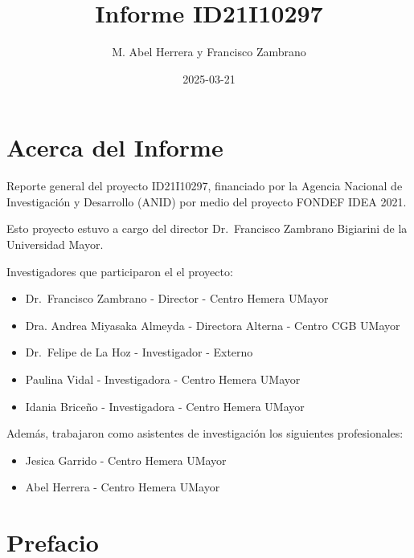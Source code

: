 \documentclass[
  letterpaper,
  DIV=11,
  numbers=noendperiod]{scrreprt}
\title{Informe ID21I10297}
\author{M. Abel Herrera y Francisco Zambrano}
\date{2025-03-21}
\providecommand{\tightlist}{%
  \setlength{\itemsep}{0pt}\setlength{\parskip}{0pt}}\usepackage{longtable,booktabs,array}
\renewcommand*\contentsname{Tabla de contenidos}
\newcommand\contentsname{Tabla de contenidos}
\begin{document}
\maketitle

\renewcommand*\contentsname{Tabla de contenidos}
{
\hypersetup{linkcolor=}
\setcounter{tocdepth}{2}
\tableofcontents
}


\chapter*{Acerca del Informe}\label{acerca-del-informe}


Reporte general del proyecto ID21I10297, financiado por la Agencia
Nacional de Investigación y Desarrollo (ANID) por medio del proyecto
FONDEF IDEA 2021.

Esto proyecto estuvo a cargo del director Dr.~Francisco Zambrano
Bigiarini de la Universidad Mayor.

Investigadores que participaron el el proyecto:

\begin{itemize}
\tightlist
\item
  Dr.~Francisco Zambrano - Director - Centro Hemera UMayor
\item
  Dra. Andrea Miyasaka Almeyda - Directora Alterna - Centro CGB UMayor
\item
  Dr.~Felipe de La Hoz - Investigador - Externo
\item
  Paulina Vidal - Investigadora - Centro Hemera UMayor
\item
  Idania Briceño - Investigadora - Centro Hemera UMayor
\end{itemize}

Además, trabajaron como asistentes de investigación los siguientes
profesionales:

\begin{itemize}
\tightlist
\item
  Jesica Garrido - Centro Hemera UMayor
\item
  Abel Herrera - Centro Hemera UMayor
\end{itemize}


\chapter*{Prefacio}\label{prefacio}
\end{document}
